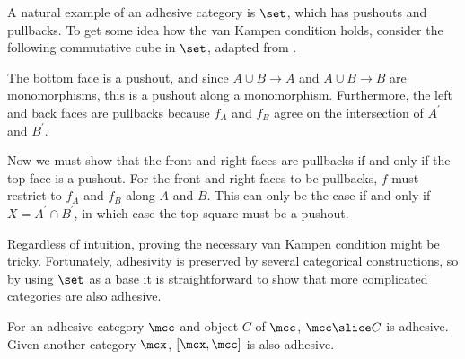\begin{example}
    A natural example of an adhesive category is \(\set\), which has pushouts
    and pullbacks.
    To get some idea how the van Kampen condition holds, consider the
    following commutative cube in \(\set\), adapted from
    \cite[Sec.\ 4.3]{kissinger2012pictures}.
    \begin{center}
    \end{center}
    The bottom face is a pushout, and since \(A \cup B \to A\) and
    \(A \cup B \to B\) are monomorphisms, this is a pushout along a
    monomorphism.
    Furthermore, the left and back faces are pullbacks because \(f_A\) and
    \(f_B\) agree on the intersection of \(A^\prime\) and \(B^\prime\).

    Now we must show that the front and right faces are pullbacks if and only if
    the top face is a pushout.
    For the front and right faces to be pullbacks, \(f\) must restrict to
    \(f_A\) and \(f_B\) along \(A\) and \(B\).
    This can only be the case if and only if \(X = A^\prime \cap B^\prime\), in
    which case the top square must be a pushout.
\end{example}

Regardless of intuition, proving the necessary van Kampen condition might be
tricky.
Fortunately, adhesivity is preserved by several categorical constructions, so
by using \(\set\) as a base it is straightforward to show that more complicated
categories are also adhesive.

\begin{proposition}
    For an adhesive category \(\mcc\) and object \(C\) of \(\mcc\),
    \(\mcc \slice C\) is adhesive.
    Given another category \(\mcx\), \([\mcx, \mcc]\) is also adhesive.
\end{proposition}

